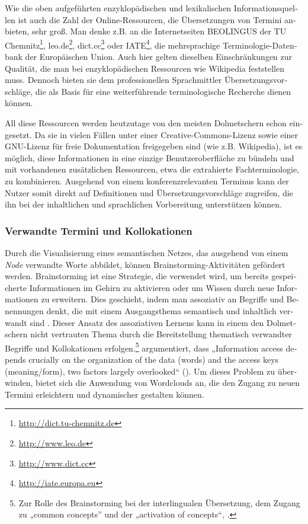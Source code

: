 \documentclass[output=paper]{LSP/langsci}
\begin{document}
\begin{otherlanguage}{ngerman}
Wie die oben aufgeführten enzyklopädischen und lexikalischen Informationsquellen ist auch die Zahl der Online-Ressourcen, die Übersetzungen von Termini anbieten, sehr groß. Man denke z.B. an die Internetseiten BEOLINGUS der TU Chemnitz\footnote{\url{http://dict.tu-chemnitz.de}}, leo.de\footnote{\url{http://www.leo.de}}, dict.cc\footnote{\url{http://www.dict.cc}} oder IATE\footnote{\url{http://iate.europa.eu}}, die mehrsprachige Terminologie-Datenbank der Europäischen Union. Auch hier gelten dieselben Einschränkungen zur Qualität, die man bei enzyklopädischen Ressourcen wie Wikipedia feststellen muss. Dennoch bieten sie dem professionellen Sprachmittler Übersetzungsvorschläge, die als Basis für eine weiterführende terminologische Recherche dienen können. 

All diese Ressourcen werden heutzutage von den meisten Dolmetschern schon eingesetzt. Da sie in vielen Fällen unter einer Creative-Commons-Lizenz sowie einer GNU-Lizenz für freie Dokumentation freigegeben sind (wie z.B. Wikipedia), ist es möglich, diese Informationen in eine einzige Benutzeroberfläche zu bündeln und mit vorhandenen zusätzlichen Ressourcen, etwa die extrahierte Fachterminologie, zu kombinieren. Ausgehend von einem konferenzrelevanten Terminus kann der Nutzer somit direkt auf Definitionen und Übersetzungsvorschläge zugreifen, die ihn bei der inhaltlichen und sprachlichen Vorbereitung unterstützen können.

\subsubsection{Verwandte Termini und Kollokationen}\label{sec:fantinuoli:6.1.5}

Durch die Visualisierung eines semantischen Netzes, das ausgehend von einem \textit{Node} verwandte Worte abbildet, können Brainstorming-Aktivitäten gefördert werden. Brainstorming ist eine Strategie, die verwendet wird, um bereits gespeicherte Informationen im Gehirn zu aktivieren oder um Wissen durch neue Informationen zu erweitern. Dies geschieht, indem man assoziativ an Begriffe und Benennungen denkt, die mit einem Ausgangsthema semantisch und inhaltlich verwandt sind \citep{Osborn1957}. Dieser Ansatz des assoziativen Lernens kann in einem den Dolmetschern nicht vertrauten Thema durch die Bereitstellung thematisch verwandter Begriffe und Kollokationen erfolgen.\footnote{Zur Rolle des Brainstorming bei der interlingualen Übersetzung, dem Zugang zu „common concepts” und der „activation of concepts“, \citet{Blot2003}.} \citeauthor{Zock2010} argumentiert, dass „Information access depends crucially on the organization of the data (words) and the access keys (meaning/form), two factors largely overlooked“ (\citeyear[201]{Zock2010}). Um dieses Problem zu überwinden, bietet sich die Anwendung von Wordclouds an, die den Zugang zu neuen Termini erleichtern und dynamischer gestalten können. 


\end{otherlanguage}
\end{document}
